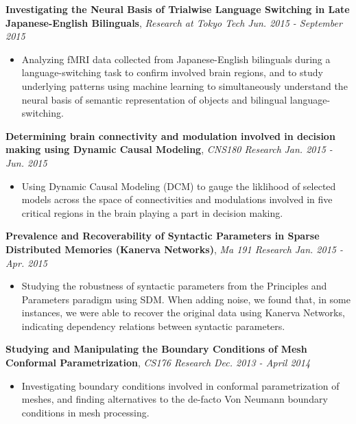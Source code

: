 \documentclass[9pt]{article}
\newenvironment{changemargin}[2]{%
  \begin{list}{}{%
    \setlength{\topsep}{0pt}%
    \setlength{\leftmargin}{#1}%
    \setlength{\rightmargin}{#2}%
    \setlength{\listparindent}{\parindent}%
    \setlength{\itemindent}{\parindent}%
    \setlength{\parsep}{\parskip}%
  }%
  \item[]}{\end{list}
}
\newenvironment{body} {
	\vspace*{-16pt}
	\begin{changemargin}{-0.25in}{-0.5in}
  }	
	{\end{changemargin}
}
\begin{document}
\begin{body}
	\textbf{Investigating the Neural Basis of Trialwise Language Switching in Late Japanese-English Bilinguals}, \emph{Research at Tokyo Tech} \hfill \emph{Jun. 2015 - September 2015} \\
		\vspace*{-3pt}
	\begin{itemize} \itemsep -0pt
	\item Analyzing fMRI data collected from Japanese-English bilinguals during a language-switching task to confirm involved brain regions, and to study underlying patterns using machine learning to simultaneously understand the neural basis of semantic representation of objects and bilingual language-switching.
	\end{itemize}
	\textbf{Determining brain connectivity and modulation involved in decision making using Dynamic Causal Modeling}, \emph{CNS180 Research} \hfill \emph{Jan. 2015 - Jun. 2015} \\
		\vspace*{-3pt}
	\begin{itemize} \itemsep -0pt
	\item Using Dynamic Causal Modeling (DCM) to gauge the liklihood of selected models across the space of connectivities and modulations involved in five critical regions in the brain playing a part in decision making.
	\end{itemize}
	\textbf{Prevalence and Recoverability of Syntactic Parameters in Sparse Distributed Memories (Kanerva Networks)}, \emph{Ma 191 Research} \hfill \emph{Jan. 2015 - Apr. 2015}
	\begin{itemize}
	\item Studying the robustness of syntactic parameters from the Principles and Parameters paradigm using SDM. When adding noise, we found that, in some instances, we were able to recover the original data using Kanerva Networks, indicating dependency relations between syntactic parameters.
	\end{itemize}
	\textbf{Studying and Manipulating the Boundary Conditions of Mesh Conformal Parametrization}, \emph{CS176 Research} \hfill \emph{Dec. 2013 - April 2014} \\
		\vspace*{-3pt}
	\begin{itemize} \itemsep -0pt
	\item Investigating boundary conditions involved in conformal parametrization of meshes, and finding alternatives to the de-facto Von Neumann boundary conditions in mesh processing.

\end{itemize}
\end{body}
\end{document}
